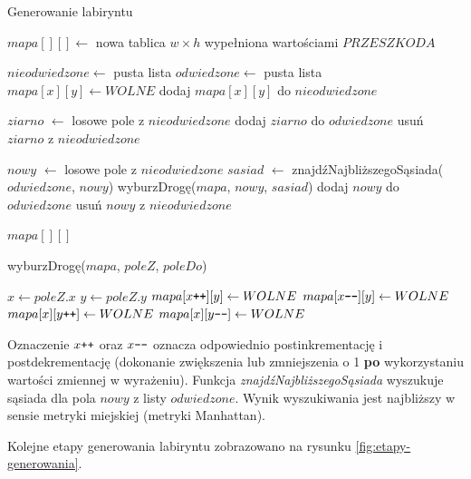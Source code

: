 \begin{algorithm}[H]
  \caption{Generowanie labiryntu}\label{alg:mazegen}
  \begin{algorithmic}[1]

\STATE $mapa[][] \gets$ nowa tablica $w \times h$ wypełniona wartościami $PRZESZKODA$

\STATE $nieodwiedzone \gets$ pusta lista
\STATE $odwiedzone \gets$ pusta lista
		\STATE $mapa[x][y] \gets WOLNE$
		\STATE dodaj $mapa[x][y]$ do $nieodwiedzone$
	\ENDFOR
\ENDFOR

\STATE $ziarno$ $\gets$ losowe pole z $nieodwiedzone$
\STATE dodaj $ziarno$ do $odwiedzone$
\STATE usuń $ziarno$ z $nieodwiedzone$

	\STATE $nowy$ $\gets$ losowe pole z $nieodwiedzone$
	\STATE $sasiad$ $\gets$ znajdźNajbliższegoSąsiada($odwiedzone$, $nowy$)
	\STATE wyburzDrogę($mapa$, $nowy$, $sasiad$)
	\STATE dodaj $nowy$ do $odwiedzone$
	\STATE usuń $nowy$ z $nieodwiedzone$
\ENDWHILE

\RETURN $mapa[][]$

\STATE 
{} wyburzDrogę($mapa$, $poleZ$, $poleDo$)
	\begin{ALC@g}
	\STATE $x \gets poleZ.x$
	\STATE $y \gets poleZ.y$
		\STATE $mapa[x\verb-++-][y] \gets WOLNE$ 
	\ENDWHILE
		\STATE $mapa[x\verb+--+][y] \gets WOLNE$
	\ENDWHILE
		\STATE $mapa[x][y\verb-++-] \gets WOLNE$
	\ENDWHILE
		\STATE $mapa[x][y\verb+--+] \gets WOLNE$
	\ENDWHILE
	\end{ALC@g}
	\end{algorithmic}
\end{algorithm}

Oznaczenie $x\verb-++-$ oraz $x\verb+--+$ oznacza odpowiednio postinkrementację i postdekrementację (dokonanie zwiększenia lub zmniejszenia o 1 {\bf po} wykorzystaniu wartości zmiennej w wyrażeniu).
Funkcja {\it znajdźNajbliższegoSąsiada} wyszukuje sąsiada dla pola $nowy$ z listy $odwiedzone$. Wynik wyszukiwania jest najbliższy w sensie metryki miejskiej (metryki Manhattan).

Kolejne etapy generowania labiryntu zobrazowano na rysunku \ref{fig:etapy-generowania}.


